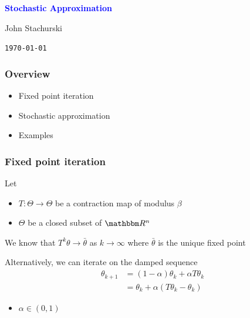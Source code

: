 \documentclass[xcolor=dvipsnames]{beamer}  %
\newcommand{\navy}[1]{\textcolor{blue}{\bf #1}}
\newcommand{\1}{\mathbbm 1}
\newcommand{\RR}{\mathbbm R}
\begin{document}


\begin{frame}
    
    \begin{center}
        \navy{\Large{Stochastic Approximation}}

        
        \vspace{2em}
        John Stachurski 

        \vspace{1em}
        \vspace{1em}
        \texttt{\today}

    \end{center}

\end{frame}

\begin{frame}
    \frametitle{Overview}
    
    \begin{itemize}
        \item Fixed point iteration
            \vspace{0.5em}
        \item Stochastic approximation
            \vspace{0.5em}
        \item Examples
    \end{itemize}

\end{frame}


\begin{frame}
    \frametitle{Fixed point iteration}

    Let 
    \begin{itemize}
        \item $T \colon \Theta \to \Theta$ be a contraction map of modulus $\beta$
        \item $\Theta$ be a closed subset of $\RR^n$
    \end{itemize}

    \vspace{0.5em}
    \vspace{0.5em}
    We know that $T^k \theta \to \bar \theta$ as $k \to \infty$ where $\bar
    \theta$ is the
    unique fixed point

    \vspace{0.5em}
    Alternatively, we can iterate on the damped sequence
    \begin{align*}
        \theta_{k+1} 
        & = (1-\alpha) \theta_k + \alpha T \theta_k
        \\
        & =  \theta_k + \alpha (T \theta_k - \theta_k)
    \end{align*}

    \begin{itemize}
        \item $\alpha \in (0,1)$
    \end{itemize}

\end{frame}
\end{document}
